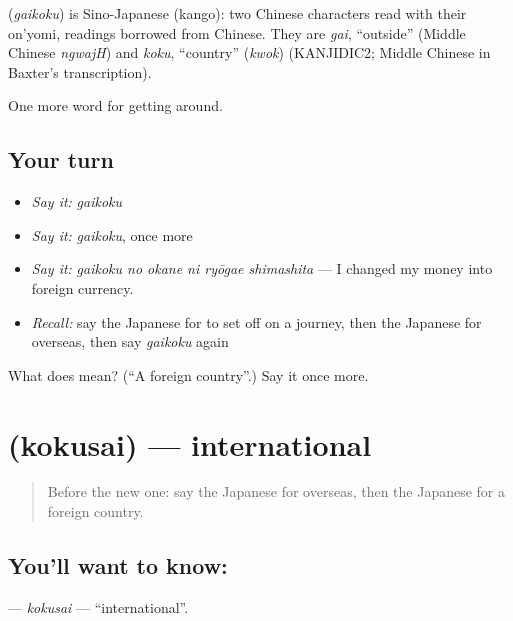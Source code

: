 \begin{cousinweb}
\textbf{} (\emph{gaikoku}) is Sino-Japanese (kango): two Chinese characters read with their on'yomi, readings borrowed from Chinese. They are \emph{gai}, \textquotedblleft{}outside\textquotedblright{} (Middle Chinese \emph{ngwajH}) and \emph{koku}, \textquotedblleft{}country\textquotedblright{} (\emph{kwok}) (KANJIDIC2; Middle Chinese in Baxter's transcription).
\end{cousinweb}

\begin{grammarlens}[title={What you've built}]
One more word for getting around.
\end{grammarlens}

\subsection*{Your turn}
\begin{itemize}
\raggedright
  \item \emph{Say it:} \emph{gaikoku}
  \item \emph{Say it:} \emph{gaikoku}, once more
  \item \emph{Say it:} \emph{gaikoku no okane ni ryōgae shimashita} — I changed my money into foreign currency.
  \item \emph{Recall:} say the Japanese for to set off on a journey, then the Japanese for overseas, then say \emph{gaikoku} again
\end{itemize}

\begin{tcolorbox}[breakable,colback=teal!4,colframe=teal!35!black,title={Before you move on}]
What does  mean? (\textquotedblleft{}A foreign country\textquotedblright{}.) Say it once more.
\end{tcolorbox}
\section[\texorpdfstring{\ja{こくさい} (kokusai)}{こくさい (kokusai)}]{ (kokusai) — international}

\label{lesson:JA-C385-kokusai}



\begin{quote}
Before the new one: say the Japanese for overseas, then the Japanese for a foreign country.
\end{quote}

\subsection*{You'll want to know: }
\textbf{} — \emph{kokusai} — \textquotedblleft{}international\textquotedblright{}.

